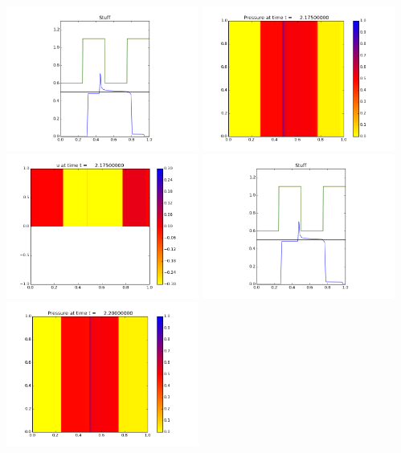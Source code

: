\documentclass[11pt]{article}
\begin{document}
\vskip 10pt 
\includegraphics[width=0.475\textwidth]{frame0086fig3.png}
\vskip 10pt 
\includegraphics[width=0.475\textwidth]{frame0087fig0.png}
\includegraphics[width=0.475\textwidth]{frame0087fig1.png}
\vskip 10pt 
\includegraphics[width=0.475\textwidth]{frame0087fig3.png}
\vskip 10pt 
\includegraphics[width=0.475\textwidth]{frame0088fig0.png}
\end{document}
